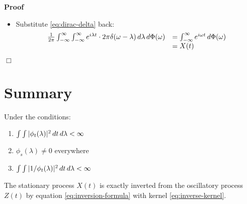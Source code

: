 \documentclass{article}
\newenvironment{proof}{\noindent\textbf{Proof\ }}{\hspace*{\fill}$\Box$\medskip}
\begin{document}
\begin{proof}
\begin{itemize}
    \item \label{step:substitute} Substitute \eqref{eq:dirac-delta} back:
    \begin{equation}
      \begin{array}{ll}
        \frac{1}{2 \pi}  \int_{- \infty}^{\infty} \int_{- \infty}^{\infty}
        e^{i \lambda t} \cdot 2 \pi \delta (\omega - \lambda)  \hspace{0.17em}
        d \lambda \hspace{0.17em} d \Phi (\omega) & = \int_{- \infty}^{\infty}
        e^{i \omega t}  \hspace{0.17em} d \Phi (\omega)\\
        & = X (t)
      \end{array}
    \end{equation}
  \end{itemize}
  
\end{proof}

\section*{Summary}

Under the conditions:
\begin{enumerate}
  \item $\int \int | \phi_t (\lambda) |^2  \hspace{0.17em} dt \hspace{0.17em}
  d \lambda < \infty$
  
  \item $\phi_s (\lambda) \neq 0$ everywhere
  
  \item $\int \int |1 / \phi_t (\lambda) |^2  \hspace{0.17em} dt
  \hspace{0.17em} d \lambda < \infty$
\end{enumerate}
The stationary process $X (t)$ is exactly inverted from the oscillatory
process $Z (t)$ by equation \eqref{eq:inversion-formula} with kernel
\eqref{eq:inverse-kernel}.
\end{document}
